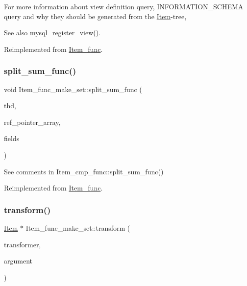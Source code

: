 For more information about view definition query, I\+N\+F\+O\+R\+M\+A\+T\+I\+O\+N\+\_\+\+S\+C\+H\+E\+MA query and why they should be generated from the \mbox{\hyperlink{classItem}{Item}}-\/tree, \begin{DoxySeeAlso}{See also}
mysql\+\_\+register\+\_\+view(). 
\end{DoxySeeAlso}


Reimplemented from \mbox{\hyperlink{classItem__func_afb302ee25d4721ace27d3f5053d4ee41}{Item\+\_\+func}}.

\mbox{\label{classItem__func__make__set_a0861efd2c2bac3164cfd61888040a092}} 
\subsubsection{\texorpdfstring{split\+\_\+sum\+\_\+func()}{split\_sum\_func()}}
{\footnotesize\ttfamily void Item\+\_\+func\+\_\+make\+\_\+set\+::split\+\_\+sum\+\_\+func (\begin{DoxyParamCaption}\item[{T\+HD $\ast$}]{thd,  }\item[{\mbox{\hyperlink{classBounds__checked__array}{Ref\+\_\+ptr\+\_\+array}}}]{ref\+\_\+pointer\+\_\+array,  }\item[{\mbox{\hyperlink{classList}{List}}$<$ \mbox{\hyperlink{classItem}{Item}} $>$ \&}]{fields }\end{DoxyParamCaption})\hspace{0.3cm}{\ttfamily [virtual]}}

See comments in Item\+\_\+cmp\+\_\+func\+::split\+\_\+sum\+\_\+func() 

Reimplemented from \mbox{\hyperlink{classItem__func_a893eba2921ac100faa99edd67879561b}{Item\+\_\+func}}.

\mbox{\label{classItem__func__make__set_a7f76c6a1bd0ad1f4ecfc30eaa0165d21}} 
\subsubsection{\texorpdfstring{transform()}{transform()}}
{\footnotesize\ttfamily \mbox{\hyperlink{classItem}{Item}} $\ast$ Item\+\_\+func\+\_\+make\+\_\+set\+::transform (\begin{DoxyParamCaption}\item[{Item\+\_\+transformer}]{transformer,  }\item[{uchar $\ast$}]{argument }\end{DoxyParamCaption})\hspace{0.3cm}{\ttfamily [virtual]}}

